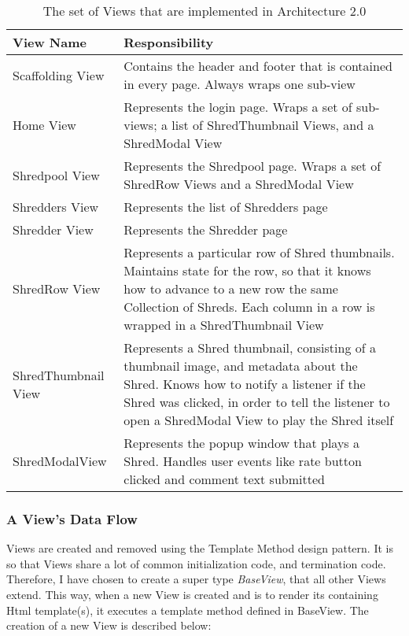 \begin{table}[htbp]
  \centering
  \begin{tabular}{|p{4cm} | p{8cm}|}
    \toprule
    View Name & Responsibility \\ 
    \midrule
    Scaffolding View & Contains the header and footer that is contained in every page. Always wraps one sub-view \\ 
    Home View & Represents the login page. Wraps a set of sub-views; a list of ShredThumbnail Views, and a ShredModal View \\ 
    Shredpool View & Represents the Shredpool page. Wraps a set of ShredRow Views and a ShredModal View \\ 
    Shredders View & Represents the list of Shredders page \\
    Shredder View &  Represents the Shredder page\\ 
    ShredRow View & Represents a particular row of Shred thumbnails. Maintains state for the row, so that it knows how to advance to a new row the same Collection of Shreds.  Each column in a row is wrapped in a ShredThumbnail View\\ 
    ShredThumbnail View & Represents a Shred thumbnail, consisting of a thumbnail image, and metadata about the Shred. Knows how to notify a listener if the Shred was clicked, in order to tell the listener to open a ShredModal View to play the Shred itself \\ 
    ShredModalView & Represents the popup window that plays a Shred. Handles user events like rate button clicked and comment text submitted  \\ 
    \bottomrule
  \end{tabular}
  \caption{The set of Views that are implemented in Architecture 2.0}
  \label{tab:label}
\end{table}

\subsubsection{A View's Data Flow}
Views are created and removed using the Template Method design pattern. It is so that Views share a lot of common initialization code, and termination code. Therefore, I have chosen to create a super type \textit{BaseView}, that all other Views extend. This way, when a new View is created and is to render its containing Html template(s), it executes a template method defined in BaseView. The creation of a new View is described below:

